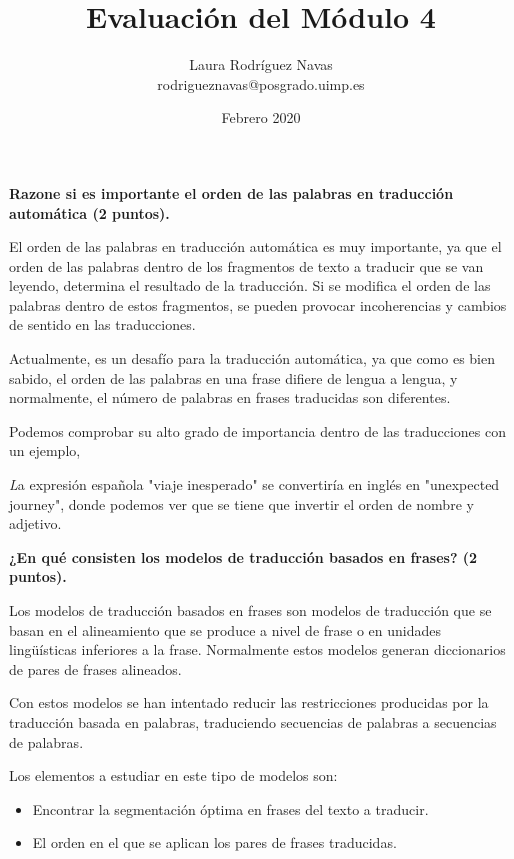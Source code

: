 \documentclass[11pt]{exam}
\title{Evaluación del Módulo 4}
\author{Laura Rodríguez Navas \\ rodrigueznavas@posgrado.uimp.es}
\date{Febrero 2020}
\begin{document}
	
\maketitle

\begin{questions}
	
{\bf \question Razone si es importante el orden de las palabras en traducción automática (2 puntos).}

El orden de las palabras en traducción automática es muy importante, ya que el orden de las palabras dentro de los fragmentos de texto a traducir que se van leyendo, determina el resultado de la traducción. Si se modifica el orden de las palabras dentro de estos fragmentos, se pueden provocar incoherencias y cambios de sentido en las traducciones.

Actualmente, es un desafío para la traducción automática, ya que como es bien sabido, el orden de las palabras en una frase difiere de lengua a lengua, y normalmente, el número de palabras en frases traducidas son diferentes.

Podemos comprobar su alto grado de importancia dentro de las traducciones con un ejemplo,

\begin{center}
	\textit La expresión española "viaje inesperado" se convertiría en inglés en "unexpected journey", donde podemos ver que se tiene que invertir el orden de nombre y adjetivo. 
\end{center}

{\bf \question ¿En qué consisten los modelos de traducción basados en frases? (2 puntos).}

Los modelos de traducción basados en frases son modelos de traducción que se basan en el alineamiento que se produce a nivel de frase o en unidades lingüísticas inferiores a la frase. Normalmente estos modelos generan diccionarios de pares de frases alineados.

Con estos modelos se han intentado reducir las restricciones producidas por la traducción basada en palabras, traduciendo secuencias de palabras a secuencias de palabras.

Los elementos a estudiar en este tipo de modelos son: 

\begin{itemize}
	\item Encontrar la segmentación óptima en frases del texto a traducir.
	\item El orden en el que se aplican los pares de frases traducidas.
\end{itemize}


\end{questions}
\end{document}
